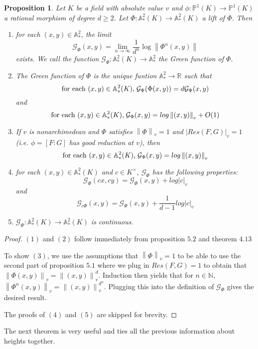 \documentclass{amsart}
\newtheorem{prop}[thm]{Proposition}
\newcommand\norm[1]{\left\lVert#1\right\rVert}
\newcommand{\R}{\mathbb{R}}
\newcommand{\AFAF}{\mathbb{A}^2}
\newcommand{\N}{\mathbb{N}}
\renewcommand{\P}{\mathbb{P}}
\newcommand{\MCG}{\mathcal{G}}
\begin{document}
\begin{prop}
Let $K$ be a field with absolute value $v$ and $\phi:\P^1(K) \rightarrow \P^1(K)$ a rational morphism of degree $d \geq 2$. Let $\Phi: \AFAF_*(K) \rightarrow \AFAF_*(K)$ a lift of $\Phi$. Then \begin{enumerate}
\item for each $(x,y) \in \AFAF_*$, the limit $$\MCG_{\Phi}(x,y) = \lim_{n \rightarrow \infty}\frac{1}{d^n}\log \norm{\Phi^n(x,y)}$$ exists. We call the function $\MCG_{\Phi}: \AFAF_*(K) \rightarrow \AFAF_*$ the Green function of $\Phi$.
\item The Green function of $\Phi$ is the unique funtion $\AFAF_* \rightarrow \R$ such that $$\text{for each $(x,y) \in \AFAF_*(K)$,\hspace{1mm}$\MCG_{\Phi}(\Phi(x,y)) = d\MCG_{\Phi}(x,y)$}$$ and $$\text{for each $(x,y) \in \AFAF_*(K)$,\hspace{1mm}$\MCG_{\Phi}(x,y) = log\norm{(x,y)}_v+O(1)$}$$
\item If $v$ is nonarchimedean and $\Phi$ satisfies $\norm{\Phi}_v = 1$ and $|Res(F,G)|_v = 1$ (i.e. $\phi = [F:G]$ has good reduction at $v$), then $$\text{for each } (x,y) \in \AFAF_*(K)\text{,\hspace{1mm}}\MCG_{\Phi}(x,y) = log\norm{(x,y)}_v$$
\item for each $(x,y) \in \AFAF_*(K)$ and $c \in K^{\times}$,  $\MCG_{\Phi}$ has the following properties: $$\MCG_{\Phi}(cx,cy) = \MCG_{\Phi}(x,y) + log|c|_v$$ and $$\MCG_{c \Phi}(x,y) = \MCG_{\Phi}(x,y) + \frac{1}{d-1}log|c|_v$$
\item $\MCG_{\Phi}: \AFAF_*(K) \rightarrow \AFAF_*(K)$ is continuous.
\end{enumerate}
\end{prop}

\begin{proof}
$(1)$ and $(2)$ follow immediately from proposition $5.2$ and theorem $4.13$

To show $(3)$, we use the assumptions that $\norm{\Phi}_v = 1$ to be able to use the second part of proposition $5.1$ where we plug in $Res(F,G) = 1$ to obtain that $\norm{\Phi(x,y)}_v = \norm{(x,y)}_v^d$. Induction then yields that for $n \in \N$, $\norm{\Phi^n(x,y)}_v = \norm{(x,y)}_v^{d^n}$. Plugging this into the definition of $\MCG_{\Phi}$ gives the desired result.

The proofs of $(4)$ and $(5)$ are skipped for brevity.
\end{proof}

The next theorem is very useful and ties all the previous information about heights together.
\end{document}
